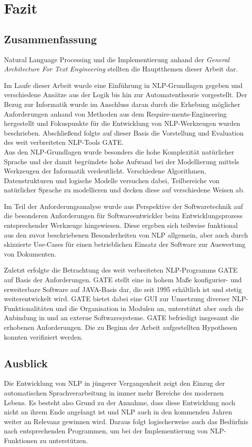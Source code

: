 \documentclass[12pt]{report}
\begin{document}
\chapter{Fazit}
\section{Zusammenfassung}
Natural Language Processing und die Implementierung anhand der \textit{General Architecture For Text Engineering} stellten die Hauptthemen dieser Arbeit dar.

Im Laufe dieser Arbeit wurde eine Einführung in NLP-Grundlagen gegeben und verschiedene Ansätze aus der Logik bis hin zur Automatentheorie vorgestellt. Der Bezug zur Informatik wurde im Anschluss daran durch die Erhebung möglicher Anforderungen anhand von Methoden aus dem Require-ments-Engineering hergestellt und Fokuspunkte für die Entwicklung von NLP-Werkzeugen wurden beschrieben. Abschließend folgte auf dieser Basis die Vorstellung und Evaluation des weit verbreiteten NLP-Tools GATE. \\

Aus den NLP-Grundlagen wurde besonders die hohe Komplexität natürlicher Sprache und der damit begründete hohe Aufwand bei der Modellierung mittels Werkzeugen der Informatik verdeutlicht. Verschiedene Algorithmen, Datenstrukturen und logische Modelle versuchen dabei, Teilbereiche von natürlicher Sprache zu modellieren und decken diese auf verschiedene Weisen ab.

Im Teil der Anforderungsanalyse wurde aus Perspektive der Softwaretechnik auf die besonderen Anforderungen für Softwareentwickler beim Entwicklungsprozess entsprechender Werkzeuge hingewiesen. Diese ergeben sich teilweise funktional aus den zuvor beschriebenen Besonderheiten von NLP allgemein, aber auch durch skizzierte Use-Cases für einen betrieblichen Einsatz der Software zur Auswertung von Dokumenten.

Zuletzt erfolgte die Betrachtung des weit verbreiteten NLP-Programms GATE auf Basis der Anforderungen. GATE stellt eine in hohem Maße konfigurier- und erweiterbare Software auf JAVA-Basis dar, die seit 1995 erhältlich ist und stetig weiterentwickelt wird. GATE bietet dabei eine GUI zur Umsetzung diverser NLP-Funktionalitäten und die Organisation in Modulen an, unterstützt aber auch die Anbindung in und an externe Softwaresysteme. GATE befriedigt insgesamt die erhobenen Anforderungen. Die zu Beginn der Arbeit aufgestellten Hypothesen konnten verifiziert werden.

\section{Ausblick}
Die Entwicklung von NLP in jüngerer Vergangenheit zeigt den Einzug der automatischen Sprachverarbeitung in immer mehr Bereiche des modernen Lebens. Es besteht also Grund zu der Annahme, dass diese Entwicklung noch nicht an ihrem Ende angelangt ist und NLP auch in den kommenden Jahren weiter an Relevanz gewinnen wird. Daraus folgt logischerweise auch das Bedürfnis nach entsprechenden Programmen, um bei der Implementierung von NLP-Funktionen zu unterstützen.\\
\end{document}
